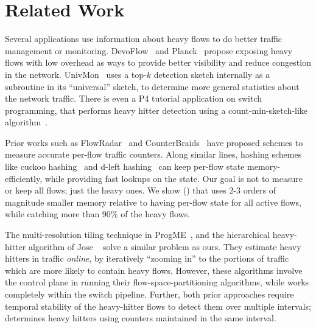 \section{Related Work}
\label{sec:other-related}

 Several applications
use information about heavy flows to do better traffic
management or monitoring. DevoFlow~\cite{devoflow} and
Planck~\cite{planck} propose exposing heavy flows with low overhead as ways to
provide better visibility and reduce congestion in the
network. UnivMon~\cite{univmon} uses a top-$k$ detection sketch internally as a
subroutine in its ``universal'' sketch, to determine more general statistics
about the network traffic. There is even a P4 tutorial application on switch
programming, that performs heavy hitter detection using a count-min-sketch-like
algorithm~\cite{p4-sigcomm-tutorial-hh-example}.

 Prior works such as
FlowRadar~\cite{li2016flowradar} and CounterBraids~\cite{counterbraids}
have proposed schemes to
measure accurate per-flow traffic counters. Along similar lines, hashing schemes
like cuckoo hashing~\cite{cuckoo-hashing} and d-left
hashing~\cite{vocking2003asymmetry} can keep per-flow state memory-efficiently,
while providing fast lookups on the state. Our goal is not to measure or keep
all flows; just the heavy ones. We show () that \TheSystem
uses 2-3 orders of magnitude smaller memory relative to having per-flow state
for all active flows, while catching more than 90\% of the heavy flows.

 The multi-resolution tiling
technique in ProgME~\cite{progme}, and the hierarchical heavy-hitter algorithm
of Jose \etal~\cite{jose2011online} solve a similar problem as
ours. They estimate heavy hitters in traffic {\em online}, by iteratively
``zooming in'' to the
portions of traffic which are more likely to contain heavy flows. However, these
algorithms involve the control plane in running their
flow-space-partitioning algorithms, while \TheSystem works completely within the
switch pipeline. Further, both prior approaches require temporal stability of
the heavy-hitter flows to detect them over multiple intervals; \TheSystem
determines heavy hitters using counters maintained in the same interval.


